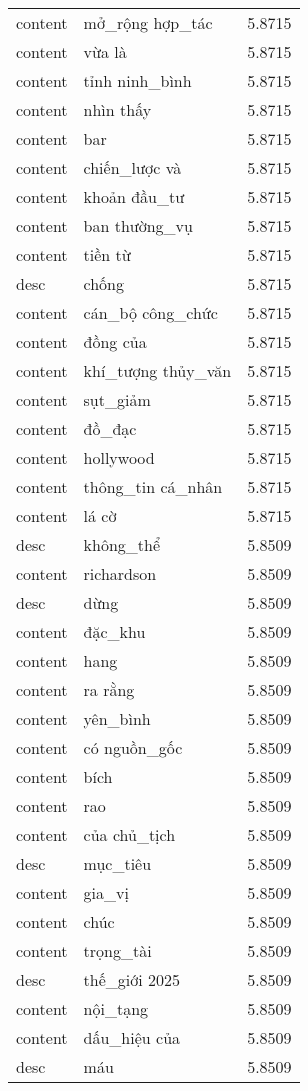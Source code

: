 \documentclass{article}
\begin{document}
\begin{tabular}{lll}
content & mở\_rộng hợp\_tác & 5.8715\\
content & vừa là & 5.8715\\
content & tỉnh ninh\_bình & 5.8715\\
content & nhìn thấy & 5.8715\\
content & bar & 5.8715\\
content & chiến\_lược và & 5.8715\\
content & khoản đầu\_tư & 5.8715\\
content & ban thường\_vụ & 5.8715\\
content & tiền từ & 5.8715\\
desc & chống & 5.8715\\
content & cán\_bộ công\_chức & 5.8715\\
content & đồng của & 5.8715\\
content & khí\_tượng thủy\_văn & 5.8715\\
content & sụt\_giảm & 5.8715\\
content & đồ\_đạc & 5.8715\\
content & hollywood & 5.8715\\
content & thông\_tin cá\_nhân & 5.8715\\
content & lá cờ & 5.8715\\
desc & không\_thể & 5.8509\\
content & richardson & 5.8509\\
desc & dừng & 5.8509\\
content & đặc\_khu & 5.8509\\
content & hang & 5.8509\\
content & ra rằng & 5.8509\\
content & yên\_bình & 5.8509\\
content & có nguồn\_gốc & 5.8509\\
content & bích & 5.8509\\
content & rao & 5.8509\\
content & của chủ\_tịch & 5.8509\\
desc & mục\_tiêu & 5.8509\\
content & gia\_vị & 5.8509\\
content & chúc & 5.8509\\
content & trọng\_tài & 5.8509\\
desc & thế\_giới 2025 & 5.8509\\
content & nội\_tạng & 5.8509\\
content & dấu\_hiệu của & 5.8509\\
desc & máu & 5.8509\\

\end{tabular}
\end{document}
